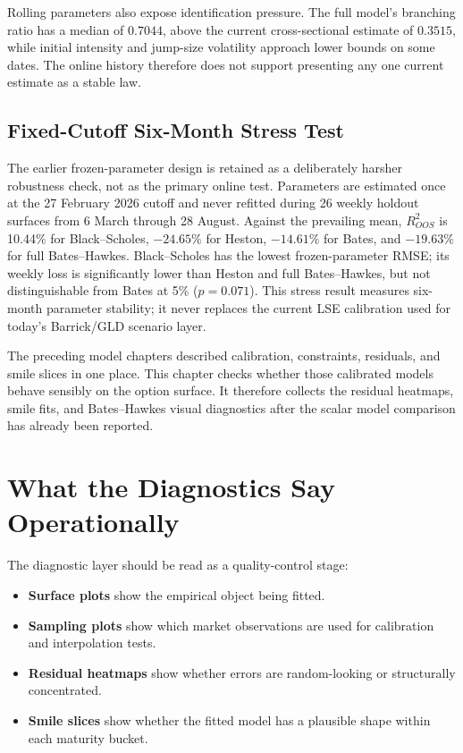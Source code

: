 \documentclass[a4paper,10pt,titlepage,oneside,openany]{book}
\theoremstyle{plain}
\theoremstyle{definition}
\theoremstyle{remark}
\begin{document}
Rolling parameters also expose identification pressure. The full model's branching ratio has a median of \(0.7044\), above the current cross-sectional estimate of \(0.3515\), while initial intensity and jump-size volatility approach lower bounds on some dates. The online history therefore does not support presenting any one current estimate as a stable law.

\subsection{Fixed-Cutoff Six-Month Stress Test}

The earlier frozen-parameter design is retained as a deliberately harsher robustness check, not as the primary online test. Parameters are estimated once at the 27 February 2026 cutoff and never refitted during 26 weekly holdout surfaces from 6 March through 28 August. Against the prevailing mean, \(R^2_{OOS}\) is 10.44\% for Black--Scholes, \(-24.65\%\) for Heston, \(-14.61\%\) for Bates, and \(-19.63\%\) for full Bates--Hawkes. Black--Scholes has the lowest frozen-parameter RMSE; its weekly loss is significantly lower than Heston and full Bates--Hawkes, but not distinguishable from Bates at 5\% (\(p=0.071\)). This stress result measures six-month parameter stability; it never replaces the current LSE calibration used for today's Barrick/GLD scenario layer.



The preceding model chapters described calibration, constraints, residuals, and smile slices in one place. This chapter checks whether those calibrated models behave sensibly on the option surface. It therefore collects the residual heatmaps, smile fits, and Bates--Hawkes visual diagnostics after the scalar model comparison has already been reported.

\section{What the Diagnostics Say Operationally}

The diagnostic layer should be read as a quality-control stage:

\begin{itemize}[leftmargin=8mm, itemsep=2pt]
    \item \textbf{Surface plots} show the empirical object being fitted.
    \item \textbf{Sampling plots} show which market observations are used for calibration and interpolation tests.
    \item \textbf{Residual heatmaps} show whether errors are random-looking or structurally concentrated.
    \item \textbf{Smile slices} show whether the fitted model has a plausible shape within each maturity bucket.
\end{itemize}
\end{document}

